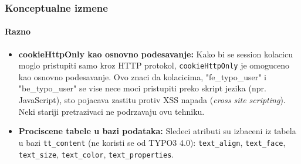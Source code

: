 \begin{frame}[fragile]
	\frametitle{Konceptualne izmene}
	\framesubtitle{Razno}

	\begin{itemize}

		\item \textbf{cookieHttpOnly kao osnovno podesavanje:}\newline
			\small
				Kako bi se session kolacicu moglo pristupiti samo kroz HTTP protokol, \texttt{cookieHttpOnly} je omoguceno kao osnovno podesavanje.\newline
				Ovo znaci da kolacicima, "fe\_typo\_user" i "be\_typo\_user" se vise nece moci pristupiti preko skript jezika (npr. JavaScript), sto pojacava zastitu protiv XSS napada (\textit{cross site scripting}). Neki stariji pretrazivaci ne podrzavaju ovu tehniku.
			\normalsize

		\item \textbf{Prociscene tabele u bazi podataka:}\newline
			\small
				Sledeci atributi su izbaceni iz tabela u bazi \texttt{tt\_content} (ne koristi se od TYPO3 4.0):
				\texttt{text\_align}, \texttt{text\_face}, \texttt{text\_size}, \texttt{text\_color}, \texttt{text\_properties}.
			\normalsize

	\end{itemize}
	
\end{frame}


